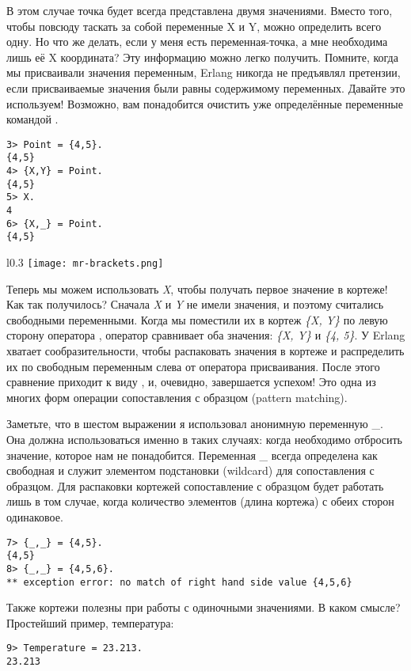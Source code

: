 В этом случае точка будет всегда представлена двумя значениями.
Вместо того, чтобы повсюду таскать за собой переменные X и Y, можно определить всего одну.
Но что же делать, если у меня есть переменная\--точка, а мне необходима лишь её X координата?
Эту информацию можно легко получить.
Помните, когда мы присваивали значения переменным, Erlang никогда не предъявлял претензии, если присваиваемые значения были равны содержимому переменных.
Давайте это используем!
Возможно, вам понадобится очистить уже определённые переменные командой .
\begin{lstlisting}[style=repl]
3> Point = {4,5}.
{4,5}
4> {X,Y} = Point.
{4,5}
5> X.
4
6> {X,_} = Point.
{4,5}
\end{lstlisting}
\begin{wrapfigure}{l}{0.3\textwidth}
    \texttt{[image: mr-brackets.png]}
\end{wrapfigure}

Теперь мы можем использовать \emph{X}, чтобы получать первое значение в кортеже!
Как так получилось?
Сначала \emph{X} и \emph{Y} не имели значения, и поэтому считались свободными переменными.
Когда мы поместили их в кортеж \emph{\{X, Y\}} по левую сторону оператора \ops{=}, оператор \ops{=} сравнивает оба значения: \emph{\{X, Y\}} и \emph{\{4, 5\}}.
У Erlang хватает сообразительности, чтобы распаковать значения в кортеже и распределить их по свободным переменным слева от оператора присваивания.
После этого сравнение приходит к виду , и, очевидно, завершается успехом!
Это одна из многих форм операции сопоставления с образцом (pattern matching).

Заметьте, что в шестом выражении я использовал анонимную переменную \_.
Она должна использоваться именно в таких случаях: когда необходимо отбросить значение, которое нам не понадобится.
Переменная \_ всегда определена как свободная и служит элементом подстановки (wildcard) для сопоставления с образцом.
Для распаковки кортежей сопоставление с образцом будет работать лишь в том случае, когда количество элементов (длина кортежа) с обеих сторон одинаковое.
\begin{lstlisting}[style=repl]
7> {_,_} = {4,5}.
{4,5}
8> {_,_} = {4,5,6}.
** exception error: no match of right hand side value {4,5,6}
\end{lstlisting}

Также кортежи полезны при работы с одиночными значениями.
В каком смысле?
Простейший пример, температура:
\begin{lstlisting}[style=repl]
9> Temperature = 23.213.
23.213
\end{lstlisting}

